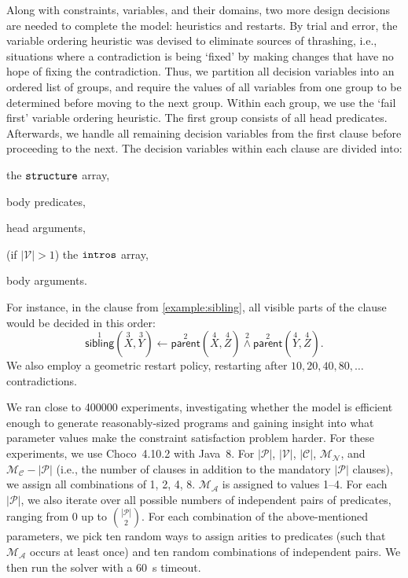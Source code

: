 \documentclass[letterpaper]{article}
\theoremstyle{definition}
\newcommand{\variable}[1]{\texttt{\textup{#1}}}
\newcommand{\predicates}{\mathcal{P}}
\newcommand{\variables}{\mathcal{V}}
\newcommand{\constants}{\mathcal{C}}
\newcommand{\maxArity}{\mathcal{M}_{\mathcal{A}}}
\newcommand{\maxNumNodes}{\mathcal{M}_{\mathcal{N}}}
\newcommand{\maxNumClauses}{\mathcal{M}_{\mathcal{C}}}
\begin{document}
Along with constraints, variables, and their domains, two more design decisions
are needed to complete the model: heuristics and restarts. By trial and error,
the variable ordering heuristic was devised to eliminate sources of thrashing,
i.e., situations where a contradiction is being `fixed' by making changes that
have no hope of fixing the contradiction. Thus, we partition all decision
variables into an ordered list of groups, and require the values of all
variables from one group to be determined before moving to the next group.
Within each group, we use the `fail first' variable ordering heuristic. The
first group consists of all head predicates. Afterwards, we handle all remaining
decision variables from the first clause before proceeding to the next. The
decision variables within each clause are divided into:
\begin{enumerate*}
\item the $\variable{structure}$ array,
\item body predicates,
\item head arguments,
\item (if $|\variables{}| > 1$) the $\variable{intros}$ array,
\item body arguments.
\end{enumerate*}
For instance, in the clause from \cref{example:sibling}, all visible parts of
the clause would be decided in this order:
\[
  \overset{1}{\mathsf{sibling}}(\overset{3}{X}, \overset{3}{Y}) \gets
  \overset{2}{\mathsf{parent}}(\overset{4}{X}, \overset{4}{Z})
  \overset{2}{\land} \overset{2}{\mathsf{parent}}(\overset{4}{Y},
  \overset{4}{Z}).
\]
We also employ a geometric restart policy, restarting after $10, 20, 40,
80, \dots$ contradictions.

We ran close to \num{400000} experiments, investigating whether the model is
efficient enough to generate reasonably-sized programs and gaining insight into
what parameter values make the constraint satisfaction problem harder. For these
experiments, we use Choco~4.10.2 \citep{choco} with Java~8. For
$|\predicates{}|$, $|\variables{}|$, $|\constants{}|$, $\maxNumNodes{}$, and
$\maxNumClauses{} - |\predicates{}|$ (i.e., the number of clauses in addition to
the mandatory $|\predicates{}|$ clauses), we assign all combinations of 1, 2, 4,
8. $\maxArity{}$ is assigned to values 1--4. For each $|\predicates{}|$, we also
iterate over all possible numbers of independent pairs of predicates, ranging
from 0 up to $\binom{|\predicates{}|}{2}$. For each combination of the
above-mentioned parameters, we pick ten random ways to assign arities to
predicates (such that $\maxArity{}$ occurs at least once) and ten random
combinations of independent pairs. We then run the solver with a
\SI{60}{\second} timeout.
\end{document}
